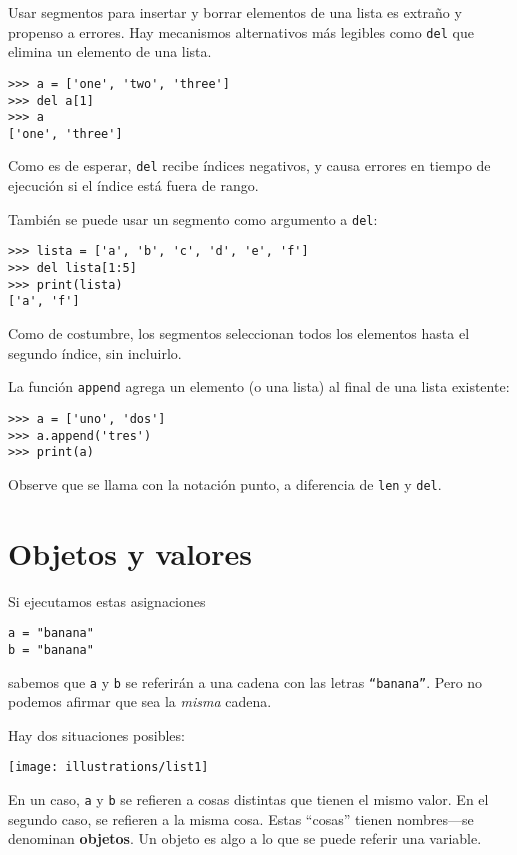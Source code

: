 
Usar segmentos para insertar y borrar elementos de una lista es extraño
y propenso a errores. Hay mecanismos alternativos más legibles como
\texttt{del} que elimina un elemento de una lista.

  
\begin{lstlisting}
>>> a = ['one', 'two', 'three']
>>> del a[1]
>>> a
['one', 'three']
\end{lstlisting}

Como es de esperar, \texttt{del} recibe índices negativos, y causa
errores en tiempo de ejecución si el índice está fuera de rango.

También se puede usar un segmento como argumento a \texttt{del}:
\begin{lstlisting}
>>> lista = ['a', 'b', 'c', 'd', 'e', 'f']
>>> del lista[1:5]
>>> print(lista)
['a', 'f']
\end{lstlisting}

Como de costumbre, los segmentos seleccionan todos los elementos hasta
el segundo índice, sin incluirlo.

La función \texttt{append} agrega un elemento (o una lista) al final
de una lista existente:
\begin{lstlisting}
>>> a = ['uno', 'dos']
>>> a.append('tres')
>>> print(a)
\end{lstlisting}

Observe que se llama con la notación punto, a diferencia de \texttt{len}
y \texttt{del}.

\section{Objetos y valores}

 

Si ejecutamos estas asignaciones
\begin{lstlisting}
a = "banana"
b = "banana"
\end{lstlisting}

sabemos que \texttt{a} y \texttt{b} se referirán a una cadena con
las letras \texttt{``banana''}. Pero no podemos afirmar que sea
la {\em misma} cadena.

Hay dos situaciones posibles:

\beforefig \centerline{\texttt{[image: illustrations/list1]}}
\afterfig

En un caso, \texttt{a} y \texttt{b} se refieren a cosas distintas
que tienen el mismo valor. En el segundo caso, se refieren a la misma
cosa. Estas ``cosas'' tienen nombres—se denominan \textbf{objetos}.
Un objeto es algo a lo que se puede referir una variable.

